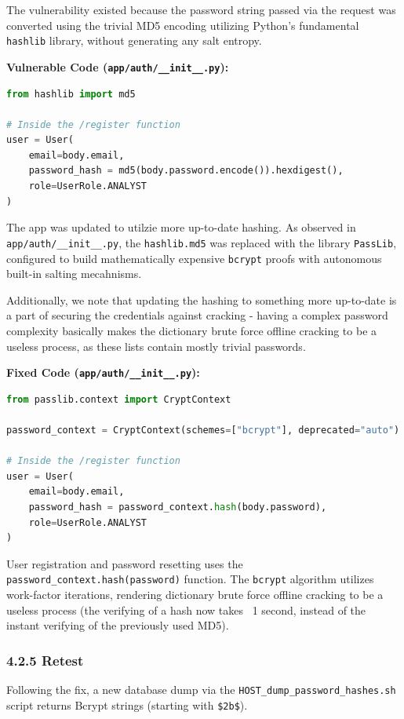 \documentclass[11pt]{article}
\begin{document}
The vulnerability existed because the password string passed via the request was converted using the trivial MD5 encoding utilizing Python's fundamental \texttt{hashlib} library, without generating any salt entropy.

\textbf{Vulnerable Code (\texttt{app/auth/\_\_init\_\_.py}):}
\begin{lstlisting}[language=Python]
from hashlib import md5

# Inside the /register function
user = User(
    email=body.email,
    password_hash = md5(body.password.encode()).hexdigest(),
    role=UserRole.ANALYST
)
\end{lstlisting}

The app was updated to utilzie more up-to-date hashing. As observed in \texttt{app/auth/\_\_init\_\_.py}, the \texttt{hashlib.md5} was replaced with the library \texttt{PassLib},  configured to build mathematically expensive \texttt{bcrypt} proofs with autonomous built-in salting mecahnisms.

Additionally, we note that updating the hashing to something more up-to-date is a part of securing the credentials against cracking - having a complex password complexity basically makes the dictionary brute force offline cracking to be a useless process, as these lists contain mostly trivial passwords.

\textbf{Fixed Code (\texttt{app/auth/\_\_init\_\_.py}):}
\begin{lstlisting}[language=Python]
from passlib.context import CryptContext

password_context = CryptContext(schemes=["bcrypt"], deprecated="auto")

# Inside the /register function
user = User(
    email=body.email,
    password_hash = password_context.hash(body.password),
    role=UserRole.ANALYST
)
\end{lstlisting}

User registration and password resetting uses the \texttt{password\_context.hash(password)} function. The \texttt{bcrypt} algorithm utilizes work-factor iterations, rendering dictionary brute force offline cracking to be a useless process (the verifying of a hash now takes ~1 second, instead of the instant verifying of the previously used MD5).

\subsubsection*{4.2.5 Retest}

Following the fix, a new database dump via the \texttt{HOST\_dump\_password\_hashes.sh} script returns Bcrypt strings (starting with \texttt{\$2b\$}).
\end{document}
